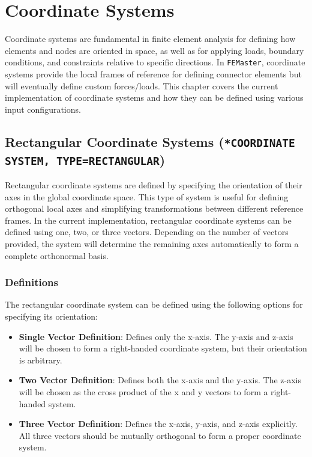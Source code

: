 
\chapter{Coordinate Systems}
\label{chap:coordinate_systems}


Coordinate systems are fundamental in finite element analysis for defining how elements and nodes are oriented in space,
as well as for applying loads, boundary conditions, and constraints relative to specific directions.
In \texttt{FEMaster}, coordinate systems provide the local frames of reference for defining connector elements but will eventually define custom forces/loads.
This chapter covers the current implementation of coordinate systems and how they can be defined using various input configurations.


\section{Rectangular Coordinate Systems (\texttt{*COORDINATE SYSTEM, TYPE=RECTANGULAR})}


Rectangular coordinate systems are defined by specifying the orientation of their axes in the global coordinate space.
This type of system is useful for defining orthogonal local axes and simplifying transformations between different reference frames. In the current implementation, rectangular coordinate systems can be defined using one, two, or three vectors. Depending on the number of vectors provided, the system will determine the remaining axes automatically to form a complete orthonormal basis.


\subsection{Definitions}


The rectangular coordinate system can be defined using the following options for specifying its orientation:


\begin{itemize}
\item \textbf{Single Vector Definition}: Defines only the x-axis. The y-axis and z-axis will be chosen to form a right-handed coordinate system, but their orientation is arbitrary.
\item \textbf{Two Vector Definition}: Defines both the x-axis and the y-axis. The z-axis will be chosen as the cross product of the x and y vectors to form a right-handed system.
\item \textbf{Three Vector Definition}: Defines the x-axis, y-axis, and z-axis explicitly. All three vectors should be mutually orthogonal to form a proper coordinate system.
\end{itemize}


